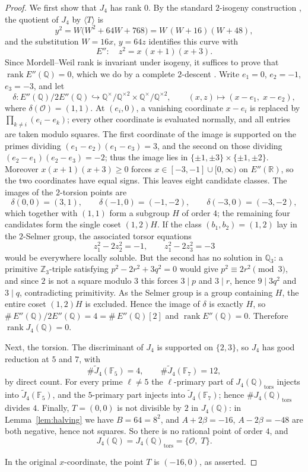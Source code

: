 \documentclass[11pt,a4paper]{amsart}
\theoremstyle{definition}
\theoremstyle{remark}
\numberwithin{equation}{section}
\newcommand{\Q}{\mathbb{Q}}
\newcommand{\Z}{\mathbb{Z}}
\begin{document}
\begin{proof}
We first show that $J_4$ has rank $0$. By the standard $2$-isogeny construction \cite[Example~III.4.5]{silverman2009arithmetic}, the quotient of $J_4$ by $\langle T\rangle$ is
\[
y^2=W\bigl(W^2+64W+768\bigr)=W\,(W+16)(W+48),
\]
and the substitution $W=16x$, $y=64z$ identifies this curve with
\[
E'':\quad z^2=x\,(x+1)(x+3).
\]
Since Mordell--Weil rank is invariant under isogeny, it suffices to prove that $\operatorname{rank}E''(\Q)=0$, which we do by a complete $2$-descent \cite[Proposition~X.1.4]{silverman2009arithmetic}. Write $e_1=0$, $e_2=-1$, $e_3=-3$, and let
\[
\delta:E''(\Q)/2E''(\Q)\hookrightarrow \Q^\times/\Q^{\times2}\times\Q^\times/\Q^{\times2},\qquad
(x,z)\longmapsto (x-e_1,\;x-e_2),
\]
where \(\delta(\mathcal O)=(1,1)\). At \((e_i,0)\), a vanishing
coordinate \(x-e_i\) is replaced by
\(\prod_{k\neq i}(e_i-e_k)\); every other coordinate is evaluated
normally, and all entries are taken modulo squares.
The first coordinate of the image is supported on the primes dividing $(e_1-e_2)(e_1-e_3)=3$, and the second on those dividing $(e_2-e_1)(e_2-e_3)=-2$; thus the image lies in $\{\pm1,\pm3\}\times\{\pm1,\pm2\}$. Moreover $x(x+1)(x+3)\geq0$ forces $x\in[-3,-1]\cup[0,\infty)$ on $E''(\mathbb{R})$, so the two coordinates have equal signs. This leaves eight candidate classes. The images of the $2$-torsion points are
\[
\delta(0,0)=(3,1),\qquad \delta(-1,0)=(-1,-2),\qquad \delta(-3,0)=(-3,-2),
\]
which together with $(1,1)$ form a subgroup $H$ of order $4$; the remaining four candidates form the single coset $(1,2)H$. If the class $(b_1,b_2)=(1,2)$ lay in the $2$-Selmer group, the associated torsor equations
\[
z_1^2-2z_2^2=-1,\qquad z_1^2-2z_3^2=-3
\]
would be everywhere locally soluble. But the second has no solution in $\Q_3$: a primitive $\Z_3$-triple satisfying $p^2-2r^2+3q^2=0$ would give $p^2\equiv2r^2\pmod 3$, and since $2$ is not a square modulo $3$ this forces $3\mid p$ and $3\mid r$, hence $9\mid 3q^2$ and $3\mid q$, contradicting primitivity. As the Selmer group is a group containing $H$, the entire coset $(1,2)H$ is excluded. Hence the image of $\delta$ is exactly $H$, so $\#\,E''(\Q)/2E''(\Q)=4=\#\,E''(\Q)[2]$ and $\operatorname{rank}E''(\Q)=0$. Therefore $\operatorname{rank}J_4(\Q)=0$.

Next, the torsion. The discriminant of $J_4$ is supported on $\{2,3\}$, so $J_4$ has good reduction at $5$ and $7$, with
\[
\#\widetilde J_4(\mathbb{F}_5)=4,\qquad \#\widetilde J_4(\mathbb{F}_7)=12,
\]
by direct count. For every prime $\ell\neq5$ the $\ell$-primary part of $J_4(\Q)_{\mathrm{tors}}$ injects into $\widetilde J_4(\mathbb{F}_5)$, and the $5$-primary part injects into $\widetilde J_4(\mathbb{F}_7)$; hence $\#J_4(\Q)_{\mathrm{tors}}$ divides $4$. Finally, $T=(0,0)$ is not divisible by $2$ in $J_4(\Q)$: in Lemma~\ref{lem:halving} we have $B=64=8^2$, and $A+2\beta=-16$, $A-2\beta=-48$ are both negative, hence not squares. So there is no rational point of order $4$, and
\[
J_4(\Q)=J_4(\Q)_{\mathrm{tors}}=\{\mathcal O,\;T\}.
\]

In the original $x$-coordinate, the point $T$ is $(-16,0)$, as asserted.
\end{proof}
\end{document}
